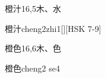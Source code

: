 \begin{Entry}{橙汁}{16,5}{⽊、⽔}
  \begin{Phonetics}{橙汁}{cheng2zhi1}[][HSK 7-9]
  \end{Phonetics}
\end{Entry}

\begin{Entry}{橙色}{16,6}{⽊、⾊}
  \begin{Phonetics}{橙色}{cheng2 se4}
  \end{Phonetics}
\end{Entry}


